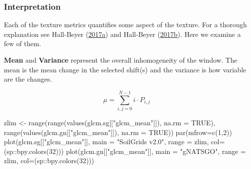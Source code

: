 \documentclass[
  letterpaper,
  DIV=11,
  numbers=noendperiod]{scrartcl}
\newenvironment{Shaded}{\begin{snugshade}}{\end{snugshade}}
\newcommand{\AttributeTok}[1]{\textcolor[rgb]{0.40,0.45,0.13}{#1}}
\newcommand{\ConstantTok}[1]{\textcolor[rgb]{0.56,0.35,0.01}{#1}}
\newcommand{\DecValTok}[1]{\textcolor[rgb]{0.68,0.00,0.00}{#1}}
\newcommand{\FunctionTok}[1]{\textcolor[rgb]{0.28,0.35,0.67}{#1}}
\newcommand{\NormalTok}[1]{\textcolor[rgb]{0.00,0.23,0.31}{#1}}
\newcommand{\OtherTok}[1]{\textcolor[rgb]{0.00,0.23,0.31}{#1}}
\newcommand{\SpecialCharTok}[1]{\textcolor[rgb]{0.37,0.37,0.37}{#1}}
\newcommand{\StringTok}[1]{\textcolor[rgb]{0.13,0.47,0.30}{#1}}
\begin{document}
\hypertarget{sec-glcm-interp}{%
\subsubsection{Interpretation}\label{sec-glcm-interp}}

Each of the texture metrics quantifies some aspect of the texture. For a
thorough explanation see Hall-Beyer
(\protect\hyperlink{ref-hall-beyerGLCMTextureTutorial2017}{2017a}) and
Hall-Beyer
(\protect\hyperlink{ref-hall-beyerPracticalGuidelinesChoosing2017}{2017b}).
Here we examine a few of them.

\textbf{Mean} and \textbf{Variance} represent the overall inhomogeneity
of the window. The mean is the mean change in the selected shift(s) and
the variance is how variable are the changes.

\[\mu = \sum_{i,j = 0}^{N-1} i \cdot P_{i,j}\]

\begin{Shaded}
\begin{Highlighting}[]
\NormalTok{zlim }\OtherTok{\textless{}{-}} \FunctionTok{range}\NormalTok{(}\FunctionTok{range}\NormalTok{(}\FunctionTok{values}\NormalTok{(glcm.sg[[}\StringTok{"glcm\_mean"}\NormalTok{]]), }\AttributeTok{na.rm =} \ConstantTok{TRUE}\NormalTok{), }
                     \FunctionTok{range}\NormalTok{(}\FunctionTok{values}\NormalTok{(glcm.gn[[}\StringTok{"glcm\_mean"}\NormalTok{]]), }\AttributeTok{na.rm =} \ConstantTok{TRUE}\NormalTok{))}
\FunctionTok{par}\NormalTok{(}\AttributeTok{mfrow=}\FunctionTok{c}\NormalTok{(}\DecValTok{1}\NormalTok{,}\DecValTok{2}\NormalTok{))}
\FunctionTok{plot}\NormalTok{(glcm.sg[[}\StringTok{"glcm\_mean"}\NormalTok{]], }\AttributeTok{main =} \StringTok{"SoilGrids v2.0"}\NormalTok{, }
     \AttributeTok{range =}\NormalTok{ zlim, }\AttributeTok{col=}\NormalTok{(sp}\SpecialCharTok{::}\FunctionTok{bpy.colors}\NormalTok{(}\DecValTok{32}\NormalTok{)))}
\FunctionTok{plot}\NormalTok{(glcm.gn[[}\StringTok{"glcm\_mean"}\NormalTok{]], }\AttributeTok{main =} \StringTok{"gNATSGO"}\NormalTok{, }
     \AttributeTok{range =}\NormalTok{ zlim, }\AttributeTok{col=}\NormalTok{(sp}\SpecialCharTok{::}\FunctionTok{bpy.colors}\NormalTok{(}\DecValTok{32}\NormalTok{)))}
\end{Highlighting}
\end{Shaded}
\end{document}
